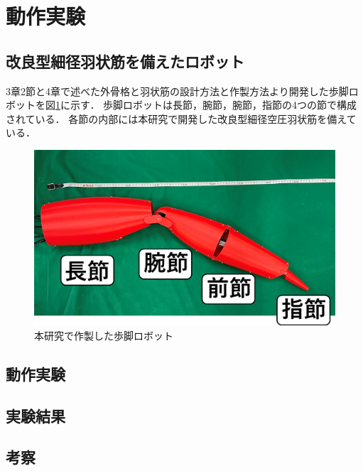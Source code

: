 \newpage
\section{動作実験}
\subsection{改良型細径羽状筋を備えたロボット}
3章2節と4章で述べた外骨格と羽状筋の設計方法と作製方法より開発した歩脚ロボットを図\ref{fig:kanirobot_new}に示す．
歩脚ロボットは長節，腕節，腕節，指節の4つの節で構成されている．
各節の内部には本研究で開発した改良型細径空圧羽状筋を備えている．

%
\begin{figure}[ht]
    \centering
    \includegraphics[scale=0.4]{image/jikki_2.png}
    \caption{本研究で作製した歩脚ロボット}
    \label{fig:kanirobot_new}
\end{figure}
%
\subsection{動作実験}

\subsection{実験結果}

\subsection{考察}
